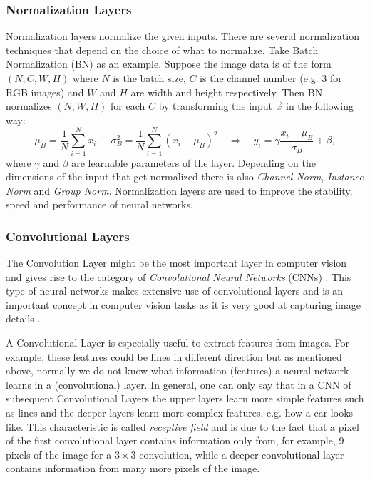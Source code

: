 \subsubsection{Normalization Layers}
Normalization layers normalize the given inputs. There are several normalization techniques that depend on the choice of what to normalize. Take Batch Normalization (BN) \cite{batch_norm} as an example. Suppose the image data is of the form $(N, C, W, H)$ where $N$ is the batch size, $C$ is the channel number (e.g. $3$ for RGB images) and $W$ and $H$ are width and height respectively. Then BN normalizes $(N, W, H)$ for each $C$ by transforming the input $\vec{x}$ in the following way:
%
\begin{equation} \label{equ:2.3}
    \mu_B=\frac{1}{N}\sum_{i=1}^Nx_i, \quad\sigma_B^2=\frac{1}{N}\sum_{i=1}^N(x_i-\mu_B)^2\quad \Longrightarrow\quad y_i=\gamma\frac{x_i-\mu_B}{\sigma_B}+\beta,
\end{equation}
%
where $\gamma$ and $\beta$ are learnable parameters of the layer. Depending on the dimensions of the input that get normalized there is also \textit{Channel Norm}, \textit{Instance Norm} and \textit{Group Norm}. Normalization layers are used to improve the stability, speed and performance of neural networks.
%
\subsubsection{Convolutional Layers}
The Convolution Layer might be the most important layer in computer vision and gives rise to the category of \textit{Convolutional Neural Networks} (CNNs) \cite{cnn}. This type of neural networks makes extensive use of convolutional layers and is an important concept in computer vision tasks as it is very good at capturing image details \cite{deep_image_prior}.

A Convolutional Layer is especially useful to extract features from images. For example, these features could be lines in different direction but as mentioned above, normally we do not know what information (features) a neural network learns in a (convolutional) layer. In general, one can only say that in a CNN of subsequent Convolutional Layers the upper layers learn more simple features such as lines and the deeper layers learn more complex features, e.g. how a car looks like. This characteristic is called \textit{receptive field} and is due to the fact that a pixel of the first convolutional layer contains information only from, for example, $9$ pixels of the image for a $3\times3$ convolution, while a deeper convolutional layer contains information from many more pixels of the image.

